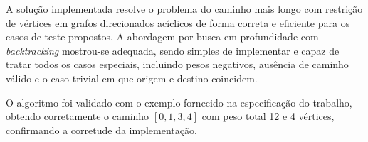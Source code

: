 \documentclass[12pt]{article}
\begin{document}
A solução implementada resolve o problema do caminho mais longo com restrição de vértices em grafos direcionados acíclicos de forma correta e eficiente para os casos de teste propostos. A abordagem por busca em profundidade com \textit{backtracking} mostrou-se adequada, sendo simples de implementar e capaz de tratar todos os casos especiais, incluindo pesos negativos, ausência de caminho válido e o caso trivial em que origem e destino coincidem.

O algoritmo foi validado com o exemplo fornecido na especificação do trabalho, obtendo corretamente o caminho $[0, 1, 3, 4]$ com peso total 12 e 4 vértices, confirmando a corretude da implementação.
\end{document}
